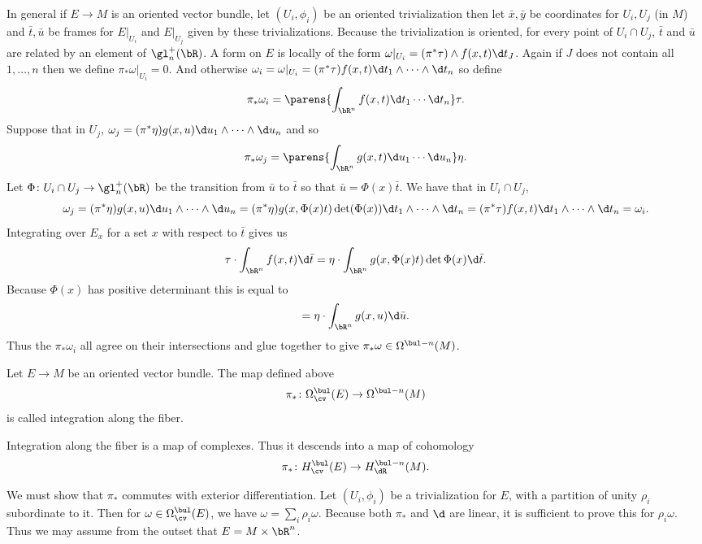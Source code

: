 In general if $E\to M$ is an oriented vector bundle, let $(U_i,\phi_i)$ be an oriented trivialization then let $\bar x,\bar y$ be coordinates
for $U_i,U_j$ (in $M$) and $\bar t,\bar u$ be frames for $E|_{U_i}$ and $E|_{U_j}$ given by these trivializations.
Because the trivialization is oriented, for every point of $U_i\cap U_j$, $\bar t$ and $\bar u$ are related by an element of $\gl_n^+(\bR)$.
A form on $E$ is locally of the form $\omega|_{U_i}=(\pi^*\tau)\wedge f(x,t)\d t_J$.
Again if $J$ does not contain all $1,\dots,n$ then we define $\pi_*\omega|_{U_i}=0$.
And otherwise $\omega_i=\omega|_{U_i}=(\pi^*\tau)f(x,t)\d t_1\wedge\cdots\wedge\d t_n$ so define
$$ \pi_*\omega_i = \parens{\int_{\bR^n}f(x,t)\d t_1\cdots\d t_n}\tau . $$
Suppose that in $U_j$, $\omega_j=(\pi^*\eta)g(x,u)\d u_1\wedge\cdots\wedge\d u_n$ and so
$$ \pi_*\omega_j = \parens{\int_{\bR^n}g(x,t)\d u_1\cdots\d u_n}\eta . $$
Let $\Phi\colon U_i\cap U_j\to\gl_n^+(\bR)$ be the transition from $\bar u$ to $\bar t$ so that $\bar u=\Phi(x)\bar t$.
We have that in $U_i\cap U_j$,
$$ \omega_j = (\pi^*\eta)g(x,u)\d u_1\wedge\cdots\wedge\d u_n = (\pi^*\eta)g(x,\Phi(x)t)\det(\Phi(x))\d t_1\wedge\cdots\wedge\d t_n
= (\pi^*\tau)f(x,t)\d t_1\wedge\cdots\wedge\d t_n = \omega_i . $$
Integrating over $E_x$ for a set $x$ with respect to $\bar t$ gives us
$$ \tau\cdot\int_{\bR^n}f(x,t)\d\bar t = \eta\cdot\int_{\bR^n}g(x,\Phi(x)t)\det{\Phi(x)}\d\bar t . $$
Because $\Phi(x)$ has positive determinant this is equal to
$$ = \eta\cdot\int_{\bR^n}g(x,u)\d\bar u . $$
Thus the $\pi_*\omega_i$ all agree on their intersections and glue together to give $\pi_*\omega\in\Omega^{\bul-n}(M)$.

\bdefn

    Let $E\to M$ be an oriented vector bundle.
    The map defined above
    $$ \pi_*\colon\Omega^\bul_\cv(E)\to\Omega^{\bul-n}(M) $$
    is called {\emphcolor integration along the fiber}.

\edefn

\bprop

    Integration along the fiber is a map of complexes.
    Thus it descends into a map of cohomology
    $$ \pi_*\colon H^\bul_\cv(E) \to H^{\bul-n}_\dR(M) . $$

\eprop

\bproof

    We must show that $\pi_*$ commutes with exterior differentiation.
    Let $(U_i,\phi_i)$ be a trivialization for $E$, with a partition of unity $\rho_i$ subordinate to it.
    Then for $\omega\in\Omega^\bul_\cv(E)$, we have $\omega=\sum_i\rho_i\omega$.
    Because both $\pi_*$ and $\d$ are linear, it is sufficient to prove this for $\rho_i\omega$.
    Thus we may assume from the outset that $E=M\times\bR^n$.

